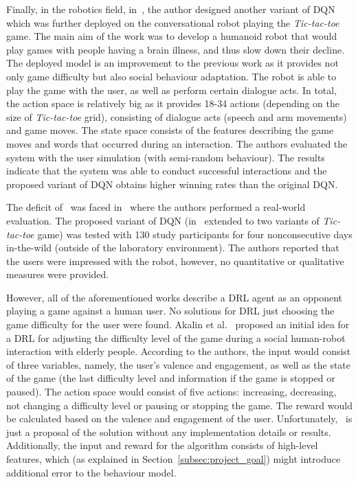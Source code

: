 \documentclass[thesis]{mas_proposal}
\begin{document}
Finally, in the robotics field, in~\cite{Cuayahuitl2017}, the author designed another variant of DQN which was further deployed on the conversational robot playing the \emph{Tic-tac-toe} game. The main aim of the work was to develop a humanoid robot that would play games with people having a brain illness, and thus slow down their decline. The deployed model is an improvement to the previous work as it provides not only game difficulty but also social behaviour adaptation. The robot is able to play the game with the user, as well as perform certain dialogue acts. In total, the action space is relatively big as it provides 18-34 actions (depending on the size of \emph{Tic-tac-toe} grid), consisting of dialogue acts (speech and arm movements) and game moves. The state space consists of the features describing the game moves and words that occurred during an interaction. The authors evaluated the system with the user simulation (with semi-random behaviour). The results indicate that the system was able to conduct successful interactions and the proposed variant of DQN obtains higher winning rates than the original DQN.

The deficit of~\cite{Cuayahuitl2017} was faced in~\cite{Cuayahuitl2020} where the authors performed a real-world evaluation. The proposed variant of DQN (in~\cite{Cuayahuitl2020} extended to two variants of \emph{Tic-tac-toe} game) was tested with 130 study participants for four nonconsecutive days in-the-wild (outside of the laboratory environment). The authors reported that the users were impressed with the robot, however, no quantitative or qualitative measures were provided.

However, all of the aforementioned works describe a DRL agent as an opponent playing a game against a human user. No solutions for DRL just choosing the game difficulty for the user were found. Akalin et al.~\cite{Akalin2018} proposed an initial idea for a DRL for adjusting the difficulty level of the game during a social human-robot interaction with elderly people. According to the authors, the input would consist of three variables, namely, the user's valence and engagement, as well as the state of the game (the last difficulty level and information if the game is stopped or paused). The action space would consist of five actions: increasing, decreasing, not changing a difficulty level or pausing or stopping the game. The reward would be calculated based on the valence and engagement of the user. Unfortunately,~\cite{Akalin2018} is just a proposal of the solution without any implementation details or results. Additionally, the input and reward for the algorithm consists of high-level features, which (as explained in Section~\ref{subsec:project_goal}) might introduce additional error to the behaviour model.
\end{document}
